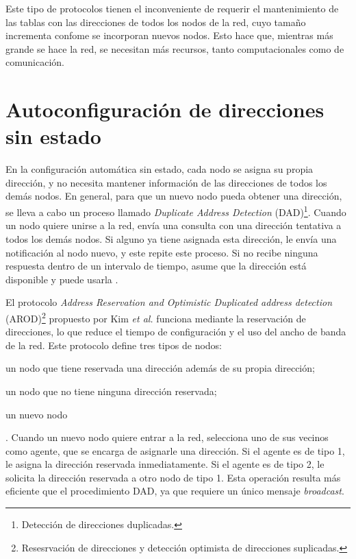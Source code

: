 Este tipo de protocolos tienen el inconveniente de requerir el mantenimiento de
las tablas con las direcciones de todos los nodos de la red, cuyo tamaño
incrementa confome se incorporan nuevos nodos. Esto hace que, mientras más
grande se hace la red, se necesitan más recursos, tanto computacionales como de
comunicación.

\section{Autoconfiguración de direcciones sin estado}
\label{sec:autoconfiguracion_de_direcciones_sin_estado}

En la configuración automática sin estado, cada nodo se asigna su propia
dirección, y no necesita mantener información de las direcciones de todos los
demás nodos. En general, para que un nuevo nodo pueda obtener una dirección, se
lleva a cabo un proceso llamado \textit{Duplicate Address Detection}
(DAD)\footnote{Detección de direcciones duplicadas.}. Cuando un nodo quiere
unirse a la red, envía una consulta con una dirección tentativa a todos los
demás nodos. Si alguno ya tiene asignada esta dirección, le envía una
notificación al nodo nuevo, y este repite este proceso. Si no recibe ninguna
respuesta dentro de un intervalo de tiempo, asume que la dirección está
disponible y puede usarla \cite{Grajzer2019}.

El protocolo \textit{Address Reservation and Optimistic Duplicated address
detection} (AROD)\footnote{Resesrvación de direcciones y detección optimista de
direcciones suplicadas.} propuesto por Kim \textit{et al.} \cite{Kim2007}
funciona mediante la reservación de direcciones, lo que reduce el tiempo de
configuración y el uso del ancho de banda de la red. Este protocolo define tres
tipos de nodos:
\begin{enumerate*}[label=\arabic*)]
  \item un nodo que tiene reservada una dirección además de su propia dirección;
  \item un nodo que no tiene ninguna dirección reservada;
  \item un nuevo nodo
\end{enumerate*}.
Cuando un nuevo nodo quiere entrar a la red, selecciona uno de sus vecinos
como agente, que se encarga de asignarle una dirección. Si el agente es de tipo
1, le asigna la dirección reservada inmediatamente. Si el agente es de tipo 2,
le solicita la dirección reservada a otro nodo de tipo 1. Esta operación
resulta más eficiente que el procedimiento DAD, ya que requiere un único
mensaje \textit{broadcast}.

